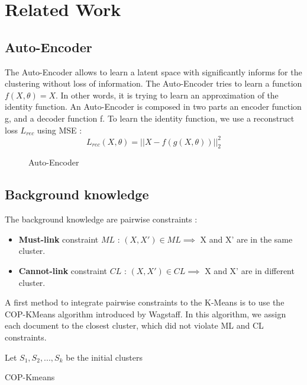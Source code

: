 \section{Related Work}\label{sec:related}

\subsection{Auto-Encoder}
The Auto-Encoder allows to learn a latent space with significantly
informs for the clustering without loss of information.
The Auto-Encoder tries to learn a function $f (X, \theta) = X$. In
other words, it is trying to learn an approximation of the identity
function. An Auto-Encoder is composed in two parts an encoder function
g, and a decoder function f. To learn the identity function, we use a
reconstruct loss $L_{rec}$ using MSE :
\begin{equation*}
  L_{rec}(X, \theta) = || X - f(g(X, \theta)) ||_2^2 
\end{equation*}

\begin{figure}
  \centering
  
  \caption{Auto-Encoder}
  \label{fig:AE}
\end{figure}
\subsection{Background knowledge}
The background knowledge are pairwise constraints :
\begin{itemize}
\item \textbf{Must-link} constraint $ML$ : $(X, X') \in ML \implies $ X and X' are in the
  same cluster.
\item \textbf{Cannot-link} constraint $CL$ : $(X, X') \in CL \implies $ X and X' are in
  different cluster.
\end{itemize}
A first method to integrate pairwise constraints to the K-Means is to use the 
COP-KMeans algorithm introduced by Wagstaff\cite{Wagstaff:2001:CKC:645530.655669}.
In this algorithm, we assign each document to the closest cluster, 
which did not violate ML and CL constraints.
\begin{algorithm}[!h]
  Let $S_1, S_2 , ..., S_k$ be the initial clusters\\
  \caption{COP-Kmeans}
\end{algorithm}

